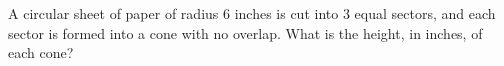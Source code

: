 A circular sheet of paper of radius $6$ inches is cut into $3$ equal sectors, and each sector is formed into a cone with no overlap. What is the height, in inches, of each cone?
